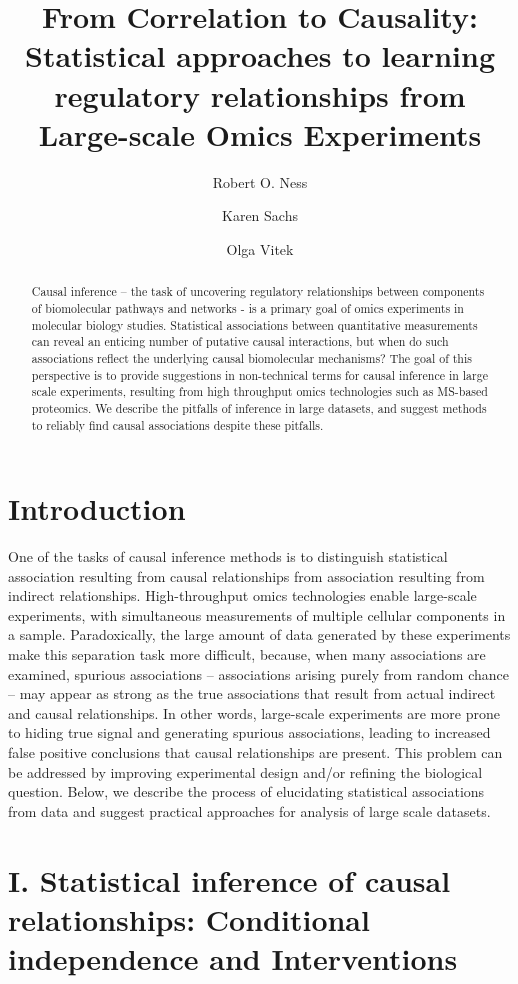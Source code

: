 \documentclass[journal=jacsat,manuscript=article]{achemso}
\author{Robert O. Ness}
\affiliation[Purdue University]{Department of Statistics, Purdue University, West Lafayette}
\author{Karen Sachs}
\affiliation[Stanford University]{School of Medicine, Stanford University, Palo Alto}
\author{Olga Vitek}
\affiliation[Northeastern University]{College of Science, College of Computer and Information Science, Northeastern University, Palo Alto}
\title[]
  {From Correlation to Causality: Statistical approaches to learning regulatory relationships from Large-scale Omics Experiments}
\begin{document}
\begin{abstract}
  Causal inference -- the task of uncovering regulatory relationships between components of biomolecular pathways and networks - is a primary goal of omics experiments in molecular biology studies.  Statistical associations between quantitative measurements can reveal an enticing number of putative causal interactions, but when do such associations reflect the underlying causal biomolecular mechanisms?  The goal of this perspective is to provide suggestions in non-technical terms for causal inference in large scale experiments, resulting from high throughput omics technologies such as MS-based proteomics.  We describe the pitfalls of inference in large datasets, and suggest methods to reliably find causal associations despite these pitfalls.
\end{abstract}

\section{Introduction}
One of the tasks of causal inference methods is to distinguish statistical association resulting from causal relationships from association resulting from indirect relationships. High-throughput omics technologies enable large-scale experiments, with simultaneous measurements of multiple cellular components in a sample. Paradoxically, the large amount of data generated by these experiments make this separation task more difficult, because, when many associations are examined, spurious associations -- associations arising purely from random chance -- may appear as strong as the true associations that result from actual indirect and causal relationships. In other words, large-scale experiments are more prone to hiding true signal and generating spurious associations, leading to increased false positive conclusions that causal relationships are present. This problem can be addressed by improving experimental design and/or refining the biological question. Below, we describe the process of elucidating statistical associations from data and suggest practical approaches for analysis of large scale datasets.


\section{I. Statistical inference of causal relationships: Conditional independence and Interventions}
\end{document}
